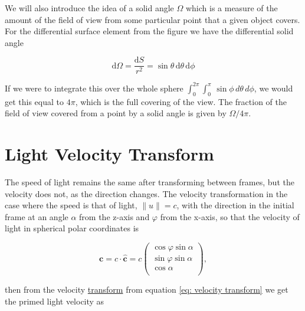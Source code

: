 We will also introduce the idea of a solid angle $\Omega$ which is a measure of the amount of the field of view from some particular point that a given object covers. For the differential surface element from the figure we have the differential solid angle

\begin{equation}
	\mathrm{d}\Omega = \frac{\mathrm{d}S}{r^2} = \sin\theta \,\mathrm{d}\theta \,\mathrm{d}\phi
\end{equation}%

If we were to integrate this over the whole sphere $ \int_{0}^{2\pi} \int_{0}^{\pi} \, \sin \phi \, d\theta \, d\phi$, we would get this equal to $4\pi$, which is the full covering of the view.
The fraction of the field of view covered from a point by a solid angle is given by $\Omega/ 4\pi$.

\section{Light Velocity Transform} \label{sect: Light Velocity Transform}

The speed of light remains the same after transforming between frames, but the velocity does not, as the direction changes.
The velocity transformation in the case where the speed is that of light, $\|u\| = {c}$, with the direction in the initial frame at an angle $\alpha$ from the z-axis and $\varphi$ from the x-axis, so that the velocity of light in spherical polar coordinates is

\begin{equation}
	\mathbf{c} = {c} \cdot {\mathbf{\hat{c}}}= {c}
	\begin{pmatrix}
		\cos{\varphi}\sin{\alpha} \\
		\sin{\varphi}\sin{\alpha} \\
		\cos{\alpha}              \\
	\end{pmatrix},
\end{equation}

then from the velocity \hyperlink{def-transform}{transform} from equation \eqref{eq: velocity transform} we get the primed light velocity as


